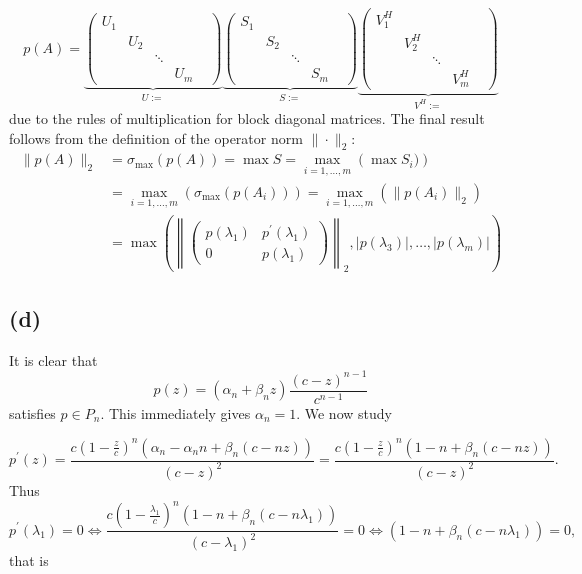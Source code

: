 \begin{equation}
  p(A) = \underbrace{\begin{pmatrix}
    U_{1}& & & &\\
    & U_{2} & & &\\
    & & \ddots& &\\
    & & & U_{m}&
\end{pmatrix}}_{U:=}
\underbrace{
\begin{pmatrix}
  S_{1}& & & &\\
  & S_{2} & & &\\
  & & \ddots& &\\
  & & & S_{m}&
\end{pmatrix}}_{S:=}
\underbrace{
\begin{pmatrix}
  V_{1}^{H}& & & &\\
  & V_{2}^{H} & & &\\
  & & \ddots& &\\
  & & & V_{m}^{H}&
\end{pmatrix}}_{V^{H}:=}
\end{equation}
due to the rules of multiplication for block diagonal matrices.
The final result follows from the definition of the operator norm $\|\cdot\|_{2}$:
\begin{align*}
  \|p(A)\|_{2} &= \sigma_{\max}(p(A)) = \max S = \max\limits_{i = 1,\ldots,m} \left( \max S_{i})\right)\\
&=\max\limits_{i = 1,\ldots,m} \left( \sigma_{\max}(p(A_{i}))\right)=\max\limits_{i = 1,\ldots,m} \left(\|p(A_{i})\|_{2}\right)\\
&= \max \left(\left\|\begin{pmatrix}
   p(\lambda_{1}) &   p^{\prime}(\lambda_{1})\\
  0 &  p(\lambda_{1})\end{pmatrix} \right\|_{2},|p(\lambda_{3})|,\ldots,|p(\lambda_{m})|\right)
\end{align*}
\subsection*{(d)}
It is clear that
\begin{equation}
  p(z) = (\alpha_{n} + \beta_{n}z)\frac{(c-z)^{n-1}}{c^{n-1}}
\end{equation}
satisfies $p\in P_{n}$. This immediately gives $\alpha_{n} = 1$. We now study

\begin{equation}
  p^{\prime}(z) = \frac{c\left(1-\frac{z}{c}\right)^{n}(\alpha_{n} - \alpha_{n} n + \beta_{n}(c-nz))}{(c-z)^{2}}= \frac{c\left(1-\frac{z}{c}\right)^{n}(1 -  n + \beta_{n}(c-nz))}{(c-z)^{2}}.
\end{equation}
Thus
\begin{equation}
  p^{\prime}(\lambda_{1}) = 0 \Leftrightarrow \frac{c\left(1-\frac{\lambda_{1}}{c}\right)^{n}(1 -  n + \beta_{n}(c-n\lambda_{1}))}{(c-\lambda_{1})^{2}} = 0 \Leftrightarrow (1 -  n + \beta_{n}(c-n\lambda_{1})) = 0,
\end{equation}
that is

